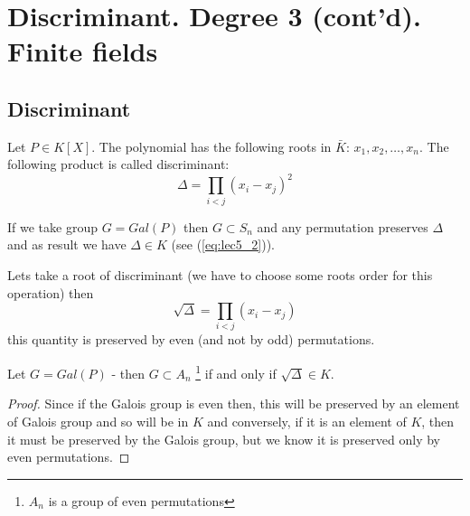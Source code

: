 \section{Discriminant. Degree 3 (cont'd). Finite fields}

\subsection{Discriminant}

\begin{definition}[discriminant]
  Let $P \in K\left[X\right]$. The polynomial has the following roots
  in $\bar{K}$: $x_1, x_2, \dots, x_n$. The following product is
  called discriminant:
  \[
  \Delta = \prod_{i < j} \left(x_i - x_j\right)^2
  \]
  \label{def:discriminant}
\end{definition}

If we take group $G = Gal\left(P\right)$ then
$G \subset S_n$ and any permutation preserves $\Delta$ and as result
we have $\Delta \in K$ (see (\ref{eq:lec5_2})).

Lets take a root of discriminant (we have to choose some roots order
for this operation) then
\[
\sqrt{\Delta} = \prod_{i < j} \left(x_i - x_j\right)
\]
this quantity is preserved by even (and not by odd) permutations.

\begin{proposition}
  Let $G = Gal\left(P\right)$ -  then $G
  \subset A_n$
  \footnote {
    $A_n$ is a group of even permutations
  }
  if and only if $\sqrt{\Delta} \in K$.
  \begin{proof}
    Since if the Galois group is even then, this will be preserved by
    an element of Galois group and so will be in $K$ and conversely, if
    it is an element of $K$, then it must be preserved by the Galois
    group, but we know it is preserved only by even permutations. 
  \end{proof}
  \label{prop:lec6_1}
\end{proposition}

